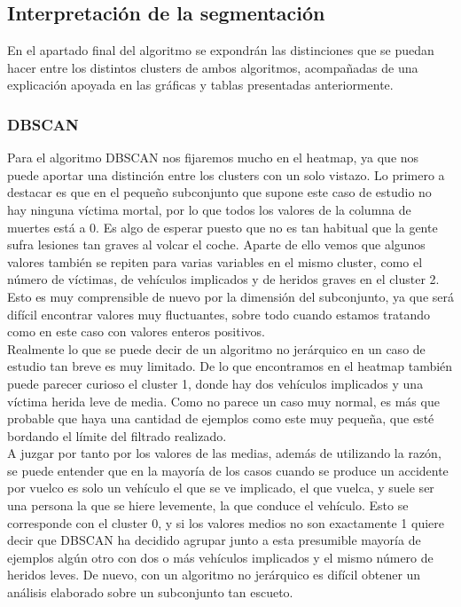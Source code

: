 	\subsection{Interpretación de la segmentación}
	En el apartado final del algoritmo se expondrán las distinciones que se puedan hacer entre los distintos clusters de ambos algoritmos, acompañadas de una explicación apoyada en las gráficas y tablas presentadas anteriormente.
	
	\subsubsection{DBSCAN}
	
	Para el algoritmo DBSCAN nos fijaremos mucho en el heatmap, ya que nos puede aportar una distinción entre los clusters con un solo vistazo. Lo primero a destacar es que en el pequeño subconjunto que supone este caso de estudio no hay ninguna víctima mortal, por lo que todos los valores de la columna de muertes está a 0. Es algo de esperar puesto que no es tan habitual que la gente sufra lesiones tan graves al volcar el coche. Aparte de ello vemos que algunos valores también se repiten para varias variables en el mismo cluster, como el número de víctimas, de vehículos implicados y de heridos graves en el cluster 2. Esto es muy comprensible de nuevo por la dimensión del subconjunto, ya que será difícil encontrar valores muy fluctuantes, sobre todo cuando estamos tratando como en este caso con valores enteros positivos.\\
	
	Realmente lo que se puede decir de un algoritmo no jerárquico en un caso de estudio tan breve es muy limitado. De lo que encontramos en el heatmap también puede parecer curioso el cluster 1, donde hay dos vehículos implicados y una víctima herida leve de media. Como no parece un caso muy normal, es más que probable que haya una cantidad de ejemplos como este muy pequeña, que esté bordando el límite del filtrado realizado.\\
	
	A juzgar por tanto por los valores de las medias, además de utilizando la razón, se puede entender que en la mayoría de los casos cuando se produce un accidente por vuelco es solo un vehículo el que se ve implicado, el que vuelca, y suele ser una persona la que se hiere levemente, la que conduce el vehículo. Esto se corresponde con el cluster 0, y si los valores medios no son exactamente 1 quiere decir que DBSCAN ha decidido agrupar junto a esta presumible mayoría de ejemplos algún otro con dos o más vehículos implicados y el mismo número de heridos leves. De nuevo, con un algoritmo no jerárquico es difícil obtener un análisis elaborado sobre un subconjunto tan escueto.
	

